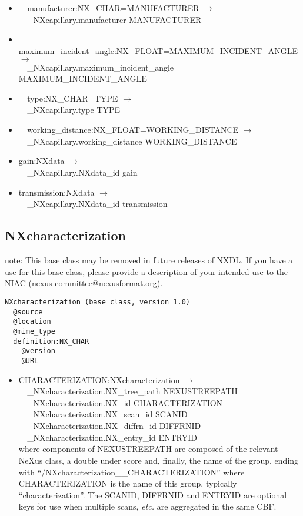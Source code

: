 \documentclass[11pt]{article}
\begin{document}
{{\begin{itemize}
\item{\verb|  |manufacturer:NX\_CHAR=MANUFACTURER $\rightarrow$\\
\verb|  |\_NXcapillary.manufacturer MANUFACTURER}

\item{\verb|  |maximum\_incident\_angle:NX\_FLOAT=MAXIMUM\_INCIDENT\_ANGLE $\rightarrow$\\
\verb|  |\_NXcapillary.maximum\_incident\_angle MAXIMUM\_INCIDENT\_ANGLE}

\item{\verb|  |type:NX\_CHAR=TYPE $\rightarrow$\\
\verb|  |\_NXcapillary.type TYPE}

\item{\verb|  |working\_distance:NX\_FLOAT=WORKING\_DISTANCE $\rightarrow$\\
\verb|  |\_NXcapillary.working\_distance WORKING\_DISTANCE}

\item{gain:NXdata $\rightarrow$\\
\verb|  |\_NXcapillary.NXdata\_id gain}

\item{transmission:NXdata $\rightarrow$\\
\verb|  |\_NXcapillary.NXdata\_id transmission}
\end{itemize}
\subsection{NXcharacterization}

note: This base class may be removed in future releases of NXDL. If you have a use for this base class, please provide a description of your intended use to the NIAC (nexus-committee@nexusformat.org).

\begin{verbatim}
NXcharacterization (base class, version 1.0)
  @source
  @location
  @mime_type
  definition:NX_CHAR
    @version
    @URL
\end{verbatim}

\begin{itemize}

\item{CHARACTERIZATION:NXcharacterization $\rightarrow$\\
\verb|  |\_NXcharacterization.NX\_tree\_path    NEXUSTREEPATH \\
\verb|  |\_NXcharacterization.NX\_id            CHARACTERIZATION\\
\verb|  |\_NXcharacterization.NX\_scan\_id      SCANID \\
\verb|  |\_NXcharacterization.NX\_diffrn\_id    DIFFRNID \\
\verb|  |\_NXcharacterization.NX\_entry\_id     ENTRYID \\
where components of NEXUSTREEPATH are composed of the
relevant NeXus class, a double under score and, finally, the
name of the group, ending with ``/NXcharacterization\_\_CHARACTERIZATION''
where CHARACTERIZATION is the name of this group, typically ``characterization''.
The SCANID, DIFFRNID and ENTRYID are optional keys for use
when multiple scans, {\it etc.} are aggregated in the same CBF.}


\end{itemize}}}
\end{document}
